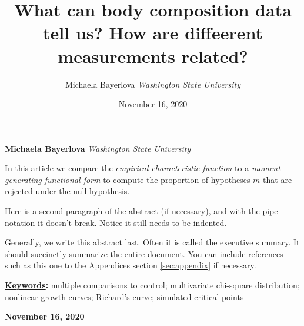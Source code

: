 \documentclass[]{article}
\title{\textbf{\textcolor{WSU.crimson}{What can body composition data
tell us?}} \newline \textbf{\textcolor{WSU.gray}{How are diffeerent
measurements related?}}  }
\author{\Large Michaela
Bayerlova\vspace{0.05in} \newline\normalsize\emph{Washington State
University}  }
\date{November 16, 2020}
\newcommand*{\authorfont}{\fontfamily{phv}\selectfont}
\renewenvironment{abstract}
 {{%
    \setlength{\leftmargin}{0mm}
    \setlength{\rightmargin}{\leftmargin}%
  }%
  \relax}
 {\endlist}
\begin{document}
	
%    


{%
\setlength{\parindent}{0pt}
\thispagestyle{plain}
{\fontsize{18}{20}\selectfont\raggedright 
\maketitle  %

}

{
   \vskip 13.5pt\relax \normalsize\fontsize{11}{12} 
   
\textbf{\authorfont Michaela
Bayerlova} \hskip 15pt \emph{\small Washington State University}   

}

}








\begin{abstract}

    \hbox{\vrule height .2pt width 39.14pc}

    \vskip 8.5pt %

\noindent In this article we compare the
\emph{empirical characteristic function} \citep{Tukey:1977, Becker:1988}
to a \emph{moment-generating-functional form} to compute the proportion
of hypotheses \(m\) that are rejected under the null hypothesis.
\vspace{0.25in}

\noindent Here is a second paragraph of the abstract (if necessary), and
with the pipe notation it doesn't break. Notice it still needs to be
indented. \vspace{0.25in}

\noindent Generally, we write this abstract last. Often it is called the
executive summary. It should succinctly summarize the entire document.
You can include references such as this one to the Appendices section
\ref{sec:appendix} if necessary.


\vskip 8.5pt \noindent \textbf{\underline{Keywords}:} multiple
comparisons to control; multivariate chi-square distribution; nonlinear
growth curves; Richard's curve; simulated critical points \par

    




    
    \hbox{\vrule height .2pt width 39.14pc}
    \vskip 5pt 
    \hfill \textbf{\textcolor{WSU.gray}{ November 16, 2020 } }
    \vskip 5pt 
    
\end{abstract}
\end{document}
